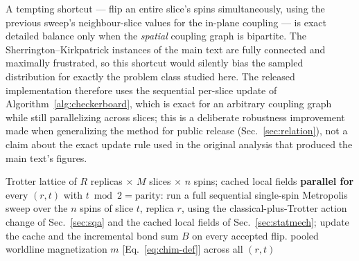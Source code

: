 \documentclass[11pt]{article}
\begin{document}
A tempting shortcut --- flip an entire slice's spins simultaneously, using the previous sweep's
neighbour-slice values for the in-plane coupling --- is exact detailed balance only when the
\emph{spatial} coupling graph is bipartite. The Sherrington--Kirkpatrick instances of the main
text are fully connected and maximally frustrated, so this shortcut would silently bias the
sampled distribution for exactly the problem class studied here. The released implementation
therefore uses the sequential per-slice update of Algorithm~\ref{alg:checkerboard}, which is exact
for an arbitrary coupling graph while still parallelizing across slices; this is a deliberate
robustness improvement made when generalizing the method for public release
(Sec.~\ref{sec:relation}), not a claim about the exact update rule used in the original analysis
that produced the main text's figures.

\begin{algorithm}[h]
\caption{One sweep of the parity-parallel checkerboard kernel underlying \texttt{sqa\_chi}}
\label{alg:checkerboard}
\begin{algorithmic}[1]
\Require Trotter lattice of $R$ replicas $\times$ $M$ slices $\times$ $n$ spins; cached local fields
    \State \textbf{parallel for} every $(r,t)$ with $t\bmod2=\text{parity}$:
    \Statex \hspace{1.5em} run a full sequential single-spin Metropolis sweep over the $n$ spins of slice $t$, replica $r$,
    \Statex \hspace{1.5em} using the classical-plus-Trotter action change of Sec.~\ref{sec:sqa} and the cached local fields of Sec.~\ref{sec:statmech};
    \Statex \hspace{1.5em} update the cache and the incremental bond sum $B$ on every accepted flip.
\EndFor
\State \Return pooled worldline magnetization $m$ [Eq.~\eqref{eq:chim-def}] across all $(r,t)$
\end{algorithmic}
\end{algorithm}
\end{document}
